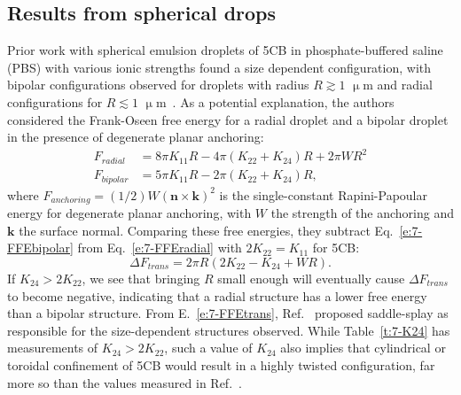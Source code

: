 \subsection{Results from spherical drops}
Prior work with spherical emulsion droplets of 5CB in phosphate-buffered saline (PBS) with various ionic strengths found a size dependent configuration, with bipolar configurations observed for droplets with radius $R \gtrsim 1$ $\upmu$m and radial configurations for $R \lesssim 1$ $\upmu$m~\cite{miller2013influence}.
As a potential explanation, the authors considered the Frank-Oseen free energy for a radial droplet and a bipolar droplet in the presence of degenerate planar anchoring:
\begin{align}
  F_{radial} &= 8 \pi K_{11} R - 4 \pi (K_{22} + K_{24}) R + 2 \pi W R^2\label{e:7-FFEradial} \\
  F_{bipolar} &= 5 \pi K_{11} R - 2 \pi (K_{22}+ K_{24}) R,\label{e:7-FFEbipolar}
\end{align}
where $F_{anchoring} = (1/2) W (\mathbf{n} \times \mathbf{k})^2$ is the single-constant Rapini-Papoular energy for degenerate planar anchoring, with $W$ the strength of the anchoring and $\mathbf{k}$ the surface normal.
Comparing these free energies, they subtract Eq.~\ref{e:7-FFEbipolar} from Eq.~\ref{e:7-FFEradial} with $2 K_{22} = K_{11}$ for 5CB:
\begin{equation}
  \Delta F_{trans} = 2\pi R (2 K_{22}-K_{24} + W R).\label{e:7-FFEtrans}
\end{equation}
If $K_{24} > 2 K_{22}$, we see that bringing $R$ small enough will eventually cause $\Delta F_{trans}$ to become negative, indicating that a radial structure has a lower free energy than a bipolar structure.
From E.~\ref{e:7-FFEtrans}, Ref.~\cite{miller2013influence} proposed saddle-splay as responsible for the size-dependent structures observed.
While Table~\ref{t:7-K24} has measurements of $K_{24} > 2 K_{22}$, such a value of $K_{24}$ also implies that cylindrical or toroidal confinement of 5CB would result in a highly twisted configuration, far more so than the values measured in Ref.~\cite{RN24}.

